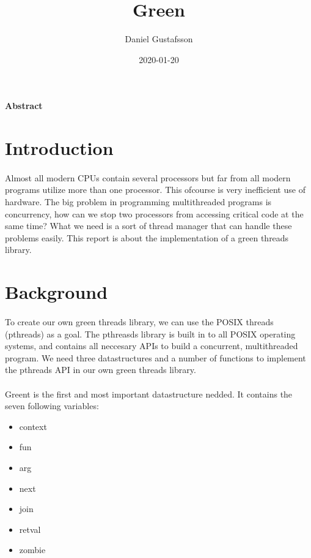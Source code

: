 \documentclass[11pt]{article}
\title{Green}
\date{2020-01-20}
\author{Daniel Gustafsson}
\begin{document}
\maketitle
{}

\newpage
{}

\paragraph{Abstract}


\section{Introduction}

\paragraph{}
Almost all modern CPUs contain several processors but far from all modern programs utilize more than one processor. This ofcourse is very inefficient 
use of hardware. The big problem in programming multithreaded programs is concurrency, how can we stop two processors from accessing critical code
at the same time? What we need is a sort of thread manager that can handle these problems easily. This report is about
the implementation of a green threads library.

\section{Background}

\paragraph{}
To create our own green threads library, we can use the POSIX threads (pthreads) as a goal. The pthreasds library is built in to all POSIX operating systems,
and contains all neccesary APIs to build a concurrent, multithreaded program. We need three datastructures and a number of functions to implement the
pthreads API in our own green threads library. 

\paragraph{}
Green\textunderscore t is the first and most important datastructure nedded. It contains the seven following variables:

\begin{itemize}
\item context
\item fun
\item arg
\item next
\item join
\item retval
\item zombie
\end{itemize}
\end{document}
